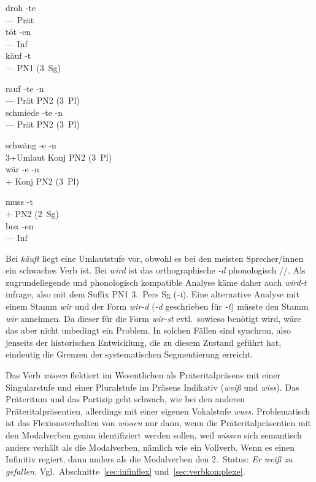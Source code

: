 \begin{exe}
\begin{xlist}
    \ex\gll droh -te\\
    --- Prät\\
    \ex\gll töt -en\\
    --- Inf\\
    \ex\gll käuf -t\\
    --- {PN1 (3~Sg)}\\
  \end{xlist}
  \ex
  \begin{xlist}
    \ex\gll rauf -te -n\\
    --- Prät {PN2 (3~Pl)}\\
    \ex\gll schmiede -te -n\\
    --- Prät {PN2 (3~Pl)}\\
  \end{xlist}
  \ex
  \begin{xlist}
    \ex\gll schwäng -e -n\\
    3+Umlaut Konj {PN2 (3~Pl)}\\
    \ex\gll wär -e -n\\
    $+$ Konj {PN2 (3~Pl)}\\
  \end{xlist}
  \ex
  \begin{xlist}
    \ex\gll muss -t\\
    $+$ {PN2 (2~Sg)}\\
    \ex\gll box -en\\
    --- Inf\\
  \end{xlist}
\end{exe}

Bei \textit{käuft} liegt eine Umlautstufe vor, obwohl es bei den meisten Sprecher\slash innen ein schwaches Verb ist.
Bei \textit{wird} ist das orthographische \textit{-d} phonologisch //.
Als zugrundeliegende und phonologisch kompatible Analyse käme daher auch \textit{wird-t} infrage, also mit dem Suffix PN1 3.~Pers Sg (\textit{-t}).
Eine alternative Analyse mit einem Stamm \textit{wir} und der Form \textit{wir-d} (\textit{-d} geschrieben für \textit{-t}) müsste den Stamm \textit{wir} annehmen.
Da dieser für die Form \textit{wir-st} evtl.\ sowieso benötigt wird, wäre das aber nicht unbedingt ein Problem.
In solchen Fällen sind synchron, also jenseits der historischen Entwicklung, die zu diesem Zustand geführt hat, eindeutig die Grenzen der systematischen Segmentierung erreicht.


Das Verb \textit{wissen} flektiert im Wesentlichen als Präteritalpräsens mit einer Singularstufe und einer Pluralstufe im Präsens Indikativ (\textit{weiß} und \textit{wiss}).
Das Präteritum und das Partizip geht schwach, wie bei den anderen Präteritalpräsentien, allerdings mit einer eigenen Vokalstufe \textit{wuss}.
Problematisch ist das Flexionsverhalten von \textit{wissen} nur dann, wenn die Präteritalpräsentien mit den Modalverben genau identifiziert werden sollen, weil \textit{wissen} sich semantisch anders verhält als die Modalverben, nämlich wie ein Vollverb.
Wenn es einen Infinitiv regiert, dann anders als die Modalverben den 2.~Status: \textit{Er weiß zu gefallen.}
Vgl.\ Abschnitte~\ref{sec:infinflex} und~\ref{sec:verbkomplexe}.

